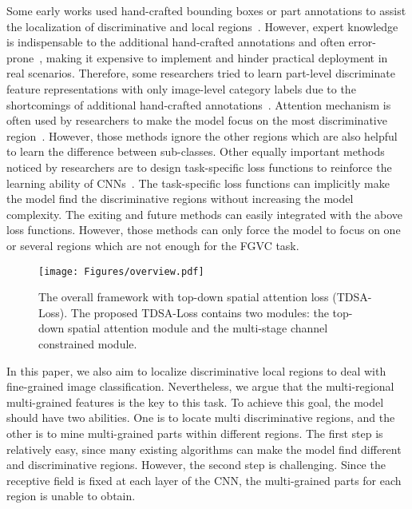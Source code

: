 \documentclass[journal]{IEEEtran}
\begin{document}
Some early works used hand-crafted bounding boxes or part annotations to assist the localization of discriminative and local regions~\cite{berg2013poof, xie2013hierarchical, branson2014bird, lei2016fast, li2019dual, ma2019fine}. However, expert knowledge is indispensable to the additional hand-crafted annotations and often error-prone~\cite{volkmer2005web}, making it expensive to implement and hinder practical deployment in real scenarios. Therefore, some researchers tried to learn part-level discriminate feature representations with only image-level category labels due to the shortcomings of additional hand-crafted annotations~\cite{dubey2018pairwise, lin2015bilinear, peng2017object,chang2020mc, wang2018learning,sun2018multi,luo2019cross}. 
Attention mechanism is often used by researchers to make the model focus on the most discriminative region~\cite{liu2020filtration,zheng2017learning,zhang2019learning,zheng2019looking,ji2020attention}. However, those methods ignore the other regions which are also helpful to learn the difference between sub-classes.
Other equally important methods noticed by researchers are to design task-specific loss functions to reinforce the learning ability of CNNs~\cite{chang2020mc,dubey2018maximum, dubey2018pairwise, gao2020channel, sun2020fine,zhuang2020learning}. The task-specific loss functions can implicitly make the model find the discriminative regions without increasing the model complexity. The exiting and future methods can easily integrated with the above loss functions.  However, those methods can only force the model to focus on one or several regions which are not enough for the FGVC task.

\begin{figure*}[!t]
\begin{center}
  \texttt{[image: Figures/overview.pdf]}
\end{center}
  \caption{The overall framework with top-down spatial attention loss (TDSA-Loss). The proposed TDSA-Loss contains two modules: the top-down spatial attention module and the multi-stage channel constrained module.} 

\label{fig:overview}
\end{figure*}

In this paper, we also aim to localize discriminative local regions to deal with fine-grained image classification. Nevertheless, we argue that the multi-regional multi-grained features is the key to this task. To achieve this goal, the model should have two abilities. One is to locate multi discriminative regions, and the other is to mine multi-grained parts within different regions. The first step is relatively easy, since many existing algorithms can make the model find different and discriminative regions. However, the second step is challenging. Since the receptive field is fixed at each layer of the CNN, the multi-grained parts for each region is unable to obtain.
\end{document}
